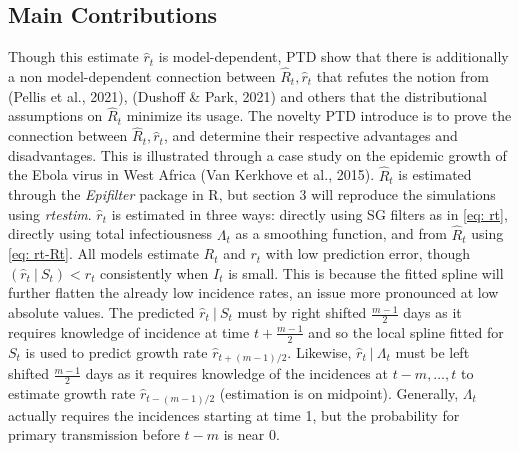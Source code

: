 \documentclass[12pt]{article}
\begin{document}
    \subsection{Main Contributions}
      Though this estimate $\hat{r}_t$ is model-dependent, PTD show that there is additionally a non model-dependent connection between 
      $\hat{R}_t, \hat{r}_t$ that refutes the notion from (Pellis et al., 2021), (Dushoff \& Park, 2021) and others that
      the distributional assumptions on $\hat{R}_t$ minimize its usage.
      The novelty PTD introduce is to prove the connection between $\hat{R}_t, \hat{r}_t$, and determine their respective advantages and disadvantages. 
      This is illustrated through a case study on the epidemic
      growth of the Ebola virus in West Africa (Van Kerkhove et al., 2015). $\hat{R}_t$ is estimated through the \textit{Epifilter} 
      package in R, but section 3 will reproduce the simulations using \textit{rtestim}. $\hat{r}_t$ is estimated in three ways: 
      directly using SG filters as in \cref{eq: rt}, directly using total infectiousness $\Lambda_t$ as a smoothing function, and 
      from $\hat{R}_t$ using \cref{eq: rt-Rt}. All models estimate $R_t$ and $r_t$ with low prediction error, though $(\hat{r}_t \ |\ S_t) < r_t$
      consistently when $I_t$ is small. This is because the fitted spline will further flatten the already low incidence rates, 
      an issue more pronounced at low absolute values. The predicted $\hat{r}_t \ |\ S_t$ must by right shifted $\frac{m-1}{2}$
      days as it requires knowledge of incidence at time $t + \frac{m-1}{2}$ and so the local spline fitted for $S_t$ is used
      to predict growth rate $\hat{r}_{t + (m-1)/2}$. Likewise,  $\hat{r}_t \ |\ \Lambda_t$ must be left shifted $\frac{m-1}{2}$
      days as it requires knowledge of the incidences at $t - m,\dots,t$ to estimate growth rate $\hat{r}_{t - (m - 1)/2}$
      (estimation is on midpoint). Generally, $\Lambda_t$ actually requires the incidences starting at time 1, but the 
      probability for primary transmission before $t - m$ is near 0.\\
\end{document}
